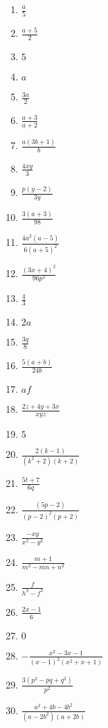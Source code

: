 {\begin{multicols}{3}
\begin{enumerate}[noitemsep, label=\textbf{\arabic*}. ] 
\item $\frac{a}{5}$%
\item $\frac{a + 5}{2}$%
\item $5$%
\item $a$%
\item $\frac{3a}{2}$%
\item $\frac{a + 3}{a + 2}$%
\item $\frac{a(3b + 1)}{b}$%
\item $\frac{4xy}{3}$%
\item $\frac{p(y - 2)}{3y}$%
\item $\frac{3(a + 3)}{98}$%
\item $\frac{4a^2(a - 5)}{6(a + 5)^2}$%
\item $\frac{(3x + 4)^2}{96p^2}$%
\item $\frac{4}{3}$%
\item $2a$%
\item $\frac{3q}{8}$%
\item $\frac{5(a + b)}{24b}$%
\item $af$%
\item $\frac{2z + 4y + 3x}{xyz}$%
\item $5$%
\item $\frac{2(k - 1)}{(k^2 + 2)(k + 2)}$%
\item $\frac{5t + 7}{6q}$%
\item $\frac{(5p - 2)}{(p - 2)^2(p+ 2)}$%
\item $\frac{-xy}{x^2 - y^2}$%
\item $\frac{m+1}{m^2 - mn + n^2}$%
\item $\frac{f}{h^3 - f^3}$%
\item $\frac{2x - 1}{6}$%
\item $0$
\item $-\frac{x^2-3x-1}{(x-1)^2(x^2+x+1)}$
\item $\frac{3(p^2-pq+q^2)}{p^2}$
\item $\frac{a^2+4b-4b^2}{(a-2b^2)(a+2b)}$
\end{enumerate}




\end{multicols}}
